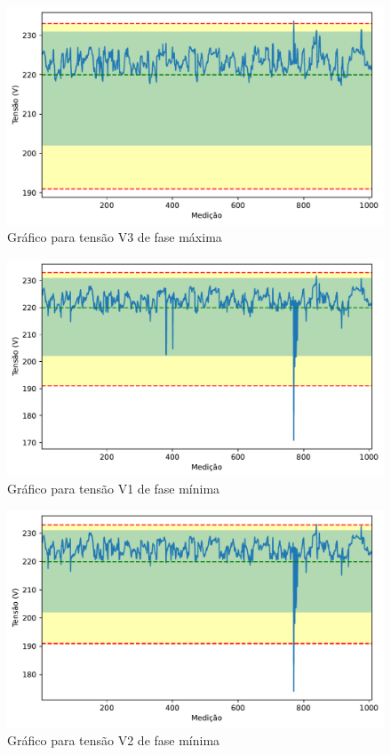 \begin{figure}[H]
	\centering
	\caption{Gráfico para tensão V3 de fase máxima}
    \includegraphics[width=16cm]{illustrations/figures/a2_V3_Max.pdf}
\end{figure}

\begin{figure}[H]
	\centering
	\caption{Gráfico para tensão V1 de fase mínima}
    \includegraphics[width=16cm]{illustrations/figures/a2_V1_Min.pdf}
\end{figure}

\begin{figure}[H]
	\centering
	\caption{Gráfico para tensão V2 de fase mínima}
    \includegraphics[width=16cm]{illustrations/figures/a2_V2_Min.pdf}
\end{figure}


